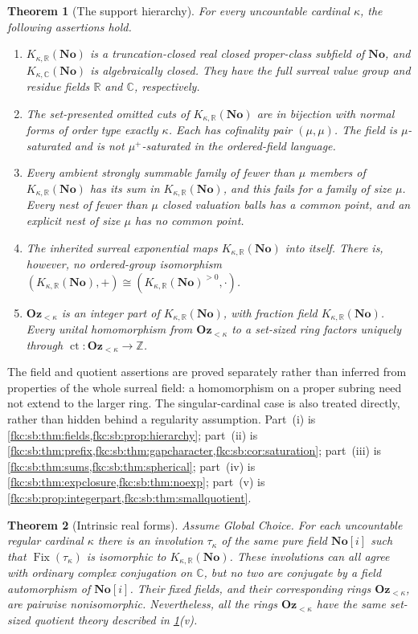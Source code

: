 \documentclass[11pt,letterpaper]{article}
\numberwithin{equation}{section}
\newtheorem{theorem}{Theorem}[section]
\theoremstyle{definition}
\theoremstyle{remark}
\newcommand{\R}{\mathbb R}
\newcommand{\C}{\mathbb C}
\newcommand{\No}{\mathbf{No}}
\newcommand{\Z}{\mathbb Z}
\newcommand{\Oz}{\mathbf{Oz}}
\newcommand{\SC}{\mathbf{No}[i]}
\newcommand{\ct}{\operatorname{ct}}
\newcommand{\Fix}{\operatorname{Fix}}
\newcommand{\KN}[2]{K_{#1,#2}(\No)}%
\newcommand{\Ok}{\Oz_{<\kappa}}
\begin{document}
\begin{theorem}[The support hierarchy]\label{fkc:sb:thm:main}
For every uncountable cardinal $\kappa$, the following assertions hold.
\begin{enumerate}[label=\textup{(\roman*)}]
\item $\KN\kappa\R$ is a truncation-closed real closed proper-class subfield of $\No$, and $\KN\kappa\C$ is algebraically closed. They have the full surreal value group and residue fields $\R$ and $\C$, respectively.
\item The set-presented omitted cuts of $\KN\kappa\R$ are in bijection with normal forms of order type exactly $\kappa$. Each has cofinality pair $(\mu,\mu)$. The field is $\mu$-saturated and is not $\mu^+$-saturated in the ordered-field language.
\item Every ambient strongly summable family of fewer than $\mu$ members of $\KN\kappa\R$ has its sum in $\KN\kappa\R$, and this fails for a family of size $\mu$. Every nest of fewer than $\mu$ closed valuation balls has a common point, and an explicit nest of size $\mu$ has no common point.
\item The inherited surreal exponential maps $\KN\kappa\R$ into itself. There is, however, no ordered-group isomorphism $(\KN\kappa\R,+)\cong(\KN\kappa\R^{>0},\cdot)$.
\item $\Ok$ is an integer part of $\KN\kappa\R$, with fraction field $\KN\kappa\R$. Every unital homomorphism from $\Ok$ to a set-sized ring factors uniquely through $\ct:\Ok\to\Z$.
\end{enumerate}
\end{theorem}

The field and quotient assertions are proved separately rather than inferred from properties of the whole surreal field: a homomorphism on a proper subring need not extend to the larger ring. The singular-cardinal case is also treated directly, rather than hidden behind a regularity assumption. Part~(i) is \cref{fkc:sb:thm:fields,fkc:sb:prop:hierarchy}; part~(ii) is \cref{fkc:sb:thm:prefix,fkc:sb:thm:gapcharacter,fkc:sb:cor:saturation}; part~(iii) is \cref{fkc:sb:thm:sums,fkc:sb:thm:spherical}; part~(iv) is \cref{fkc:sb:thm:expclosure,fkc:sb:thm:noexp}; part~(v) is \cref{fkc:sb:prop:integerpart,fkc:sb:thm:smallquotient}.

\begin{theorem}[Intrinsic real forms]\label{fkc:sb:thm:mainrealforms}
Assume Global Choice. For each uncountable regular cardinal $\kappa$ there is an involution $\tau_\kappa$ of the same pure field $\SC$ such that $\Fix(\tau_\kappa)$ is isomorphic to $\KN\kappa\R$. These involutions can all agree with ordinary complex conjugation on $\C$, but no two are conjugate by a field automorphism of $\SC$. Their fixed fields, and their corresponding rings $\Ok$, are pairwise nonisomorphic. Nevertheless, all the rings $\Ok$ have the same set-sized quotient theory described in \cref{fkc:sb:thm:main}\textup{(v)}.
\end{theorem}
\end{document}
